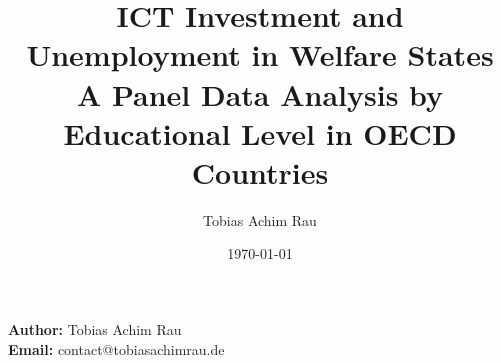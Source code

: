 \documentclass[a4paper, 12pt]{article}
\title{ICT Investment and Unemployment in Welfare States \\
\large A Panel Data Analysis by Educational Level in OECD Countries}
\author{Tobias Achim Rau}
\date{\today}
\begin{document}
\maketitle
\thispagestyle{empty}
\vspace{10cm}

\begin{center}
  \textbf{Author:} Tobias Achim Rau \\
  \textbf{Email:} contact@tobiasachimrau.de \\
\end{center}

\newpage

\setcounter{page}{1}

\tableofcontents

\newpage

\setcounter{page}{1}









\renewcommand{\bibfont}{\small}
\printbibliography
\end{document}
